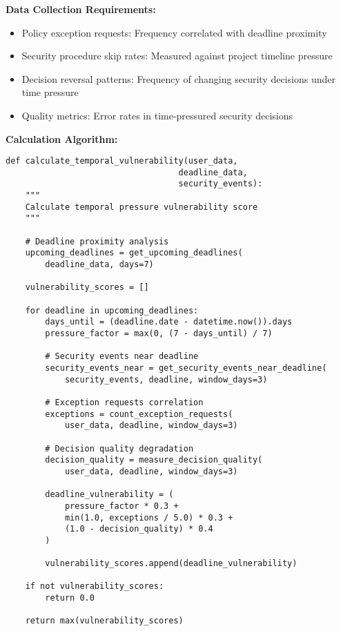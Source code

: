 \documentclass[10pt,twocolumn]{IEEEtran}
\begin{document}
\textbf{Data Collection Requirements:}
\begin{itemize}
\item Policy exception requests: Frequency correlated with deadline proximity
\item Security procedure skip rates: Measured against project timeline pressure
\item Decision reversal patterns: Frequency of changing security decisions under time pressure
\item Quality metrics: Error rates in time-pressured security decisions
\end{itemize}

\textbf{Calculation Algorithm:}
\begin{lstlisting}[caption={Temporal Pressure Vulnerability}]
def calculate_temporal_vulnerability(user_data, 
                                   deadline_data, 
                                   security_events):
    """
    Calculate temporal pressure vulnerability score
    """
    
    # Deadline proximity analysis
    upcoming_deadlines = get_upcoming_deadlines(
        deadline_data, days=7)
    
    vulnerability_scores = []
    
    for deadline in upcoming_deadlines:
        days_until = (deadline.date - datetime.now()).days
        pressure_factor = max(0, (7 - days_until) / 7)
        
        # Security events near deadline
        security_events_near = get_security_events_near_deadline(
            security_events, deadline, window_days=3)
        
        # Exception requests correlation
        exceptions = count_exception_requests(
            user_data, deadline, window_days=3)
        
        # Decision quality degradation
        decision_quality = measure_decision_quality(
            user_data, deadline, window_days=3)
        
        deadline_vulnerability = (
            pressure_factor * 0.3 +
            min(1.0, exceptions / 5.0) * 0.3 +
            (1.0 - decision_quality) * 0.4
        )
        
        vulnerability_scores.append(deadline_vulnerability)
    
    if not vulnerability_scores:
        return 0.0
    
    return max(vulnerability_scores)
\end{lstlisting}
\end{document}
